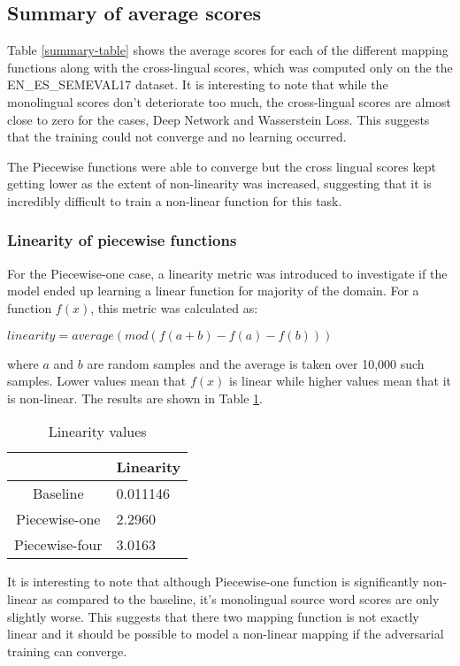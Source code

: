 \documentclass[11pt]{article}
\begin{document}
\subsection{Summary of average scores}
Table \ref{summary-table} shows the average scores for each of the different mapping functions along with the cross-lingual scores, which was computed only on the the EN\_ES\_SEMEVAL17 dataset. It is interesting to note that while the monolingual scores don't deteriorate too much, the cross-lingual scores are almost close to zero for the cases, Deep Network and Wasserstein Loss. This suggests that the training could not converge and no learning occurred.

The Piecewise functions were able to converge but the cross lingual scores kept getting lower as the extent of non-linearity was increased, suggesting that it is incredibly difficult to train a non-linear function for this task.

\subsubsection{Linearity of piecewise functions} \label{linearity}
For the Piecewise-one case, a linearity metric was introduced to investigate if the model ended up learning a linear function for majority of the domain. For a function $f(x)$, this metric was calculated as:

$linearity = average(mod(f(a + b) - f(a) - f(b)))$

where $a$ and $b$ are random samples and the average is taken over 10,000 such samples. Lower values mean that $f(x)$ is linear while higher values mean that it is non-linear. The results are shown in Table \ref{linearity-table}.

\begin{table}[h]
  \begin{center}
  \begin{tabular}{|c|l|}
  \hline
   & Linearity \\
  \hline
  Baseline & 0.011146 \\
  \hline
  Piecewise-one & 2.2960 \\
  \hline
  Piecewise-four & 3.0163 \\
  \hline
  \end{tabular}
  \end{center}
  \caption{ Linearity values}
  \label{linearity-table}
\end{table}

It is interesting to note that although Piecewise-one function is significantly non-linear as compared to the baseline, it's monolingual source word scores are only slightly worse. This suggests that there two mapping function is not exactly linear and it should be possible to model a non-linear mapping if the adversarial training can converge.
\end{document}
